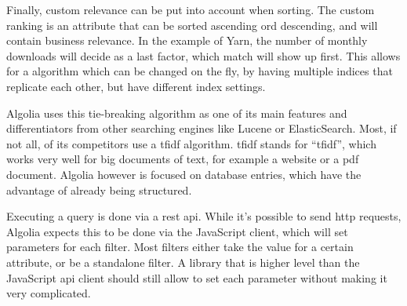 Finally, custom relevance can be put into account when sorting. The custom ranking is an attribute that can be sorted ascending ord descending, and will contain business relevance. In the example of Yarn, the number of monthly downloads will decide as a last factor, which match will show up first. This allows for a algorithm which can be changed on the fly, by having multiple indices that replicate each other, but have different index settings.

Algolia uses this tie-breaking algorithm as one of its main features and differentiators from other searching engines like Lucene or ElasticSearch. Most, if not all, of its competitors use a \acrshort{tfidf} algorithm. \acrshort{tfidf} stands for ``\acrlong{tfidf}'', which works very well for big documents of text, for example a website or a pdf document. Algolia however is focused on database entries, which have the advantage of already being structured.

Executing a query is done via a \acrshort{rest} \acrshort{api}. While it's possible to send http requests, Algolia expects this to be done via the JavaScript client, which will set parameters for each filter. Most filters either take the value for a certain \gls{attribute}, or be a standalone filter. A library that is higher level than the JavaScript \acrshort{api} client should still allow to set each parameter without making it very complicated.
